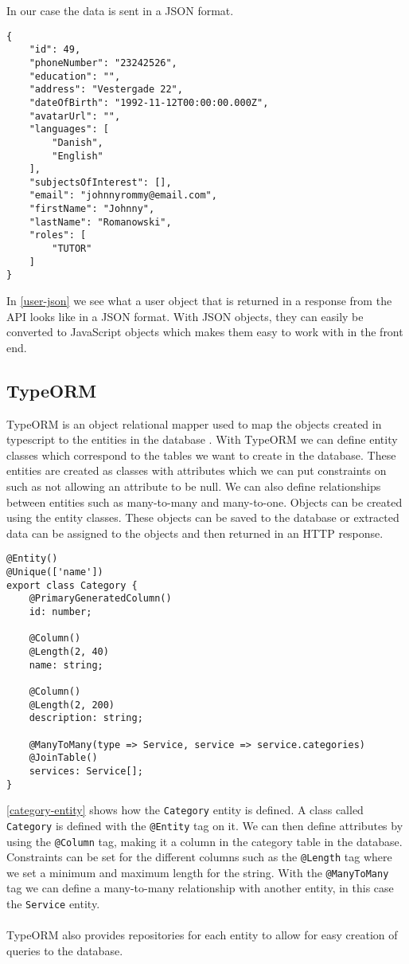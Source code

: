 In our case the data is sent in a JSON format.
\begin{lstlisting}[caption={Shows how a user object looks in a JSON format}, captionpos=b, label={user-json}]
{
    "id": 49,
    "phoneNumber": "23242526",
    "education": "",
    "address": "Vestergade 22",
    "dateOfBirth": "1992-11-12T00:00:00.000Z",
    "avatarUrl": "",
    "languages": [
        "Danish",
        "English"
    ],
    "subjectsOfInterest": [],
    "email": "johnnyrommy@email.com",
    "firstName": "Johnny",
    "lastName": "Romanowski",
    "roles": [
        "TUTOR"
    ]
}
\end{lstlisting}
In \autoref{user-json} we see what a user object that is returned in a response from the API looks like in a JSON format. 
With JSON objects, they can easily be converted to JavaScript objects which makes them easy to work with in the front end. 
\subsection{TypeORM}
TypeORM is an object relational mapper used to map the objects created in typescript to the entities in the database \cite{typeorm}.
With TypeORM we can define entity classes which correspond to the tables we want to create in the database.
These entities are created as classes with attributes which we can put constraints on such as not allowing an attribute to be null. 
We can also define relationships between entities such as many-to-many and many-to-one.
Objects can be created using the entity classes. 
These objects can be saved to the database or extracted data can be assigned to the objects and then returned in an HTTP response. 

\begin{lstlisting}[caption={The category entity and its attributes}, captionpos=b, label={category-entity}]
@Entity()
@Unique(['name'])
export class Category {
	@PrimaryGeneratedColumn()
	id: number;

	@Column()
	@Length(2, 40)
	name: string;

	@Column()
	@Length(2, 200)
	description: string;

	@ManyToMany(type => Service, service => service.categories)
	@JoinTable()
	services: Service[];
}
\end{lstlisting}
\autoref{category-entity} shows how the \texttt{Category} entity is defined. A class called \texttt{Category} is defined with the \texttt{@Entity} tag on it. 
We can then define attributes by using the \texttt{@Column} tag, making it a column in the category table in the database. 
Constraints can be set for the different columns such as the \texttt{@Length} tag where we set a minimum and maximum length for the string.
With the \texttt{@ManyToMany} tag we can define a many-to-many relationship with another entity, in this case the \texttt{Service} entity. 
\\\\
TypeORM also provides repositories for each entity to allow for easy creation of queries to the database.

